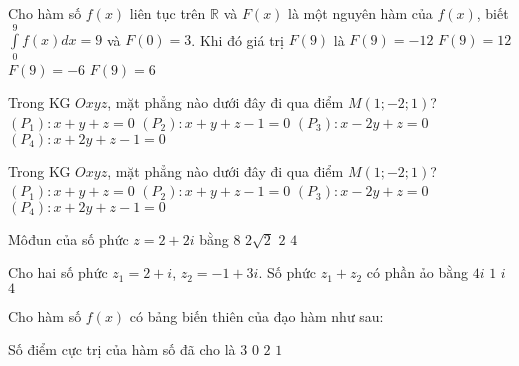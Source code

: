 \begin{ex}%
Cho hàm số $f(x)$ liên tục trên $\mathbb{R}$ và $F(x)$ là một nguyên hàm của $f(x)$, biết $\displaystyle \int\limits_{0}^{9}f(x)dx = 9$ và $F(0)=3$. Khi đó giá trị $F(9)$ là
\choice
{$F(9) = -12$}
{\True $F(9) = 12$}
{$F(9) = -6$}
{$F(9) = 6$}
\end{ex}
\begin{ex}%
Trong KG $Oxyz$, mặt phẳng nào dưới đây đi qua điểm $M(1;-2;1)$?
\choice
{\True $(P_1)\colon x + y + z = 0$}
{$(P_2)\colon x + y + z - 1= 0$}
{$(P_3)\colon x - 2y + z = 0$}
{$(P_4)\colon x + 2y + z - 1= 0$}
\end{ex}
\begin{ex}%
Trong KG $Oxyz$, mặt phẳng nào dưới đây đi qua điểm $M(1; -2; 1)$?
\choice
{\True $(P_1) \colon x + y + z = 0$}
{$(P_2) \colon x + y + z - 1 = 0$}
{$(P_3) \colon x - 2y + z = 0$}
{$(P_4) \colon x + 2y + z - 1 = 0$}
\end{ex}
\begin{ex}%
Môđun của số phức $z = 2 + 2i$ bằng
\choice
{$8$}
{\True $2\sqrt{2}$}
{$2$}
{$4$}
\end{ex}
\begin{ex}%
Cho hai số phức $z_1 = 2 + i$, $z_2 = -1 + 3i$. Số phức $z_1 + z_2$ có phần ảo bằng
\choice
{$4i$}
{$1$}
{$i$}
{\True $4$}
\end{ex}
\begin{ex}%
Cho hàm số $f(x)$ có bảng biến thiên của đạo hàm như sau:
\begin{center}
\end{center}
Số điểm cực trị của hàm số đã cho là
\choice
{$3$}
{$0$}
{\True $2$}
{$1$}
\end{ex}
